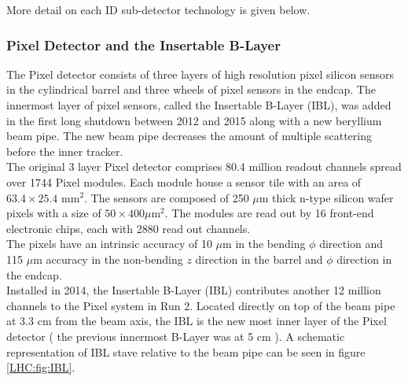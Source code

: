 \indent More detail on each ID sub-detector technology is given below. \\

\subsubsection*{ Pixel Detector and the Insertable B-Layer}

\indent The Pixel detector consists of three layers of high resolution pixel silicon sensors in the cylindrical barrel and three wheels of pixel sensors in the endcap.  The innermost layer of pixel sensors, called the Insertable B-Layer (IBL), was added in the first long shutdown between 2012 and 2015 along with a new beryllium beam pipe.  The new beam pipe decreases the amount of multiple scattering before the inner tracker. \\

\indent The original 3 layer Pixel detector comprises 80.4 million readout channels spread over 1744 Pixel modules.  Each module house a sensor tile with an area of $63.4 \times 25.4$ mm$^2$.  The sensors are composed of 250 $\mu$m thick n-type silicon wafer pixels with a size of $50\times400 \mu$m$^2$. The modules are read out by 16 front-end electronic chips, each with 2880 read out channels. \\

\indent The pixels have an intrinsic accuracy of 10 $\mu$m in the bending $\phi$ direction and 115 $\mu$m accuracy in the non-bending $z$ direction in the barrel and $\phi$ direction in the endcap.\\ 

\indent Installed in 2014, the Insertable B-Layer (IBL) contributes another 12 million channels to the Pixel system in Run 2.\cite{IBLOverview,IBL_TDR}  Located directly on top of the beam pipe at 3.3 cm from the beam axis, the IBL is the new most inner layer of the Pixel detector ( the previous innermost B-Layer was at 5 cm ). A schematic representation of IBL stave relative to the beam pipe can be seen in figure \ref{LHC:fig:IBL}. \\

